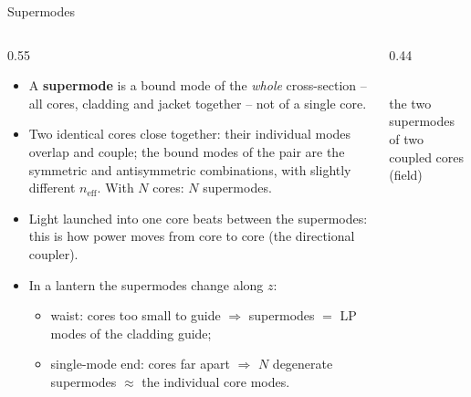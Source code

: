 \documentclass[aspectratio=169,10pt]{beamer}
\begin{document}
\begin{frame}{Supermodes}
\begin{columns}[T]
\begin{column}{0.55\textwidth}
\small
\begin{itemize}
    \item A \textbf{supermode} is a bound mode of the \emph{whole} cross-section -- all cores,
          cladding and jacket together -- not of a single core.
    \item Two identical cores close together: their individual modes overlap and couple; the
          bound modes of the pair are the symmetric and antisymmetric combinations, with
          slightly different $n_\mathrm{eff}$. With $N$ cores: $N$ supermodes.
    \item Light launched into one core beats between the supermodes: this is how power moves
          from core to core (the directional coupler).
    \item In a lantern the supermodes change along $z$:
    \begin{itemize}
        \item waist: cores too small to guide $\Rightarrow$ supermodes $=$ LP modes of the cladding guide;
        \item single-mode end: cores far apart $\Rightarrow$ $N$ degenerate supermodes $\approx$ the individual core modes.
    \end{itemize}
\end{itemize}
\end{column}
\begin{column}{0.44\textwidth}
\centering
{}\\
{\scriptsize the two supermodes of two coupled cores (field)}
\end{column}
\end{columns}
\end{frame}
\end{document}
